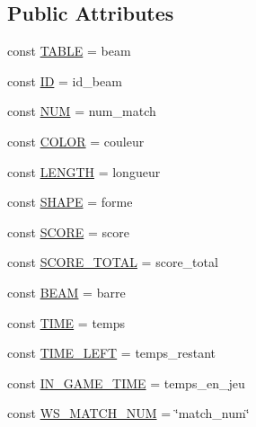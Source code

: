 \subsection*{Public Attributes}
\begin{DoxyCompactItemize}
\item 
const \hyperlink{class_m3_match_a6eaee15de69f066350ecf628365c8def}{T\+A\+B\+LE} = \textquotesingle{}beam\textquotesingle{}
\item 
const \hyperlink{class_m3_match_afc06a8237711e300cc4f52456f0f37b0}{ID} = \textquotesingle{}id\+\_\+beam\textquotesingle{}
\item 
const \hyperlink{class_m3_match_ab79cc282f40bfc70e5c0b4ff6601d8b1}{N\+UM} = \textquotesingle{}num\+\_\+match\textquotesingle{}
\item 
const \hyperlink{class_m3_match_af9f5951d2a099aa635eaedc9393862d2}{C\+O\+L\+OR} = \textquotesingle{}couleur\textquotesingle{}
\item 
const \hyperlink{class_m3_match_a40f915cc714f833bbbb379b7bcf55a0b}{L\+E\+N\+G\+TH} = \textquotesingle{}longueur\textquotesingle{}
\item 
const \hyperlink{class_m3_match_a52d9be1a9435d1be7d707f4ee1b8d663}{S\+H\+A\+PE} = \textquotesingle{}forme\textquotesingle{}
\item 
const \hyperlink{class_m3_match_a4cb63aa2d489f307bdbe9da12314681c}{S\+C\+O\+RE} = \textquotesingle{}score\textquotesingle{}
\item 
const \hyperlink{class_m3_match_a42bc52a9a8ea7be2747650c49f40e36a}{S\+C\+O\+R\+E\+\_\+\+T\+O\+T\+AL} = \textquotesingle{}score\+\_\+total\textquotesingle{}
\item 
const \hyperlink{class_m3_match_a746ffddea5afc0adb2d0b095dada0018}{B\+E\+AM} = \textquotesingle{}barre\textquotesingle{}
\item 
const \hyperlink{class_m3_match_a3b55c9f7f046069d30af06f121825f6c}{T\+I\+ME} = \textquotesingle{}temps\textquotesingle{}
\item 
const \hyperlink{class_m3_match_abab949e942dd8528660c53c4427df064}{T\+I\+M\+E\+\_\+\+L\+E\+FT} = \textquotesingle{}temps\+\_\+restant\textquotesingle{}
\item 
const \hyperlink{class_m3_match_a11e3ca3d3285baad83fa0422b2a5c2eb}{I\+N\+\_\+\+G\+A\+M\+E\+\_\+\+T\+I\+ME} = \textquotesingle{}temps\+\_\+en\+\_\+jeu\textquotesingle{}
\item 
const \hyperlink{class_m3_match_a23e96127697a48ed4a7b794f6c491a45}{W\+S\+\_\+\+M\+A\+T\+C\+H\+\_\+\+N\+UM} = \char`\"{}match\+\_\+num\char`\"{}

\end{DoxyCompactItemize}
